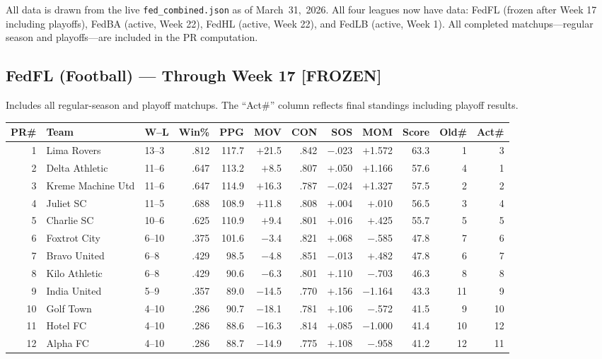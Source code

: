 \documentclass[11pt,a4paper]{article}
\newcommand{\code}[1]{\texttt{#1}}
\begin{document}
All data is drawn from the live \code{fed\_combined.json} as of March~31,~2026. All four leagues now have data: FedFL (frozen after Week 17 including playoffs), FedBA (active, Week 22), FedHL (active, Week 22), and FedLB (active, Week 1). All completed matchups---regular season and playoffs---are included in the PR computation.

\subsection{FedFL (Football) --- Through Week 17 [FROZEN]}

Includes all regular-season and playoff matchups. The ``Act\#'' column reflects final standings including playoff results.

\begin{table}[H]
\centering\small
\begin{tabular}{@{}rl l r r r r r r r r r@{}}
\toprule
\textbf{PR\#} & \textbf{Team} & \textbf{W--L} & \textbf{Win\%} & \textbf{PPG} & \textbf{MOV} & \textbf{CON} & \textbf{SOS} & \textbf{MOM} & \textbf{Score} & \textbf{Old\#} & \textbf{Act\#}\\
\midrule
1 & Lima Rovers & 13--3 & .812 & 117.7 & $+$21.5 & .842 & $-$.023 & $+$1.572 & 63.3 & 1 & 3\\
2 & Delta Athletic & 11--6 & .647 & 113.2 & $+$8.5 & .807 & $+$.050 & $+$1.166 & 57.6 & 4 & 1\\
3 & Kreme Machine Utd & 11--6 & .647 & 114.9 & $+$16.3 & .787 & $-$.024 & $+$1.327 & 57.5 & 2 & 2\\
4 & Juliet SC & 11--5 & .688 & 108.9 & $+$11.8 & .808 & $+$.004 & $+$.010 & 56.5 & 3 & 4\\
5 & Charlie SC & 10--6 & .625 & 110.9 & $+$9.4 & .801 & $+$.016 & $+$.425 & 55.7 & 5 & 5\\
6 & Foxtrot City & 6--10 & .375 & 101.6 & $-$3.4 & .821 & $+$.068 & $-$.585 & 47.8 & 7 & 6\\
7 & Bravo United & 6--8 & .429 & 98.5 & $-$4.8 & .851 & $-$.013 & $+$.482 & 47.8 & 6 & 7\\
8 & Kilo Athletic & 6--8 & .429 & 90.6 & $-$6.3 & .801 & $+$.110 & $-$.703 & 46.3 & 8 & 8\\
9 & India United & 5--9 & .357 & 89.0 & $-$14.5 & .770 & $+$.156 & $-$1.164 & 43.3 & 11 & 9\\
10 & Golf Town & 4--10 & .286 & 90.7 & $-$18.1 & .781 & $+$.106 & $-$.572 & 41.5 & 9 & 10\\
11 & Hotel FC & 4--10 & .286 & 88.6 & $-$16.3 & .814 & $+$.085 & $-$1.000 & 41.4 & 10 & 12\\
12 & Alpha FC & 4--10 & .286 & 88.7 & $-$14.9 & .775 & $+$.108 & $-$.958 & 41.2 & 12 & 11\\
\bottomrule
\end{tabular}
\end{table}
\end{document}
